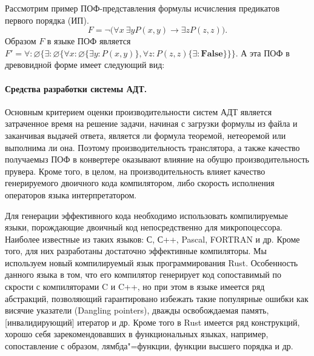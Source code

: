 \documentclass[a4paper]{jctart15b}
\begin{document}
\begin{example}
Рассмотрим пример ПОФ-представления формулы исчисления предикатов первого порядка (ИП).
$$F= \neg\bigl(\forall x\:\exists y P(x,y)\rightarrow \exists z P(z,z)\bigr).$$
Образом $F$ в языке ПОФ является $F' = \forall\colon \varnothing\{\exists\colon\varnothing\{\forall x\colon\varnothing\{\exists y\colon P(x,y)\}, \forall z\colon P(z,z)\{\exists\colon\boldsymbol{False}\}\}\}.$
А эта ПОФ в древовидной форме имеет следующий вид:
\begin{center}
\end{center}
\end{example}

\paragraph{Средства разработки системы АДТ.}
Основным критерием оценки производительности систем АДТ является затраченное время на решение задачи, начиная с загрузки формулы из файла и заканчивая выдачей ответа, является ли формула теоремой, нетеоремой или выполнима ли она. Поэтому производительность транслятора, а также качество получаемыз ПОФ в конвертере оказывают влияние на обущю производительность прувера. Кроме того, в целом, на производительность влияет качество генерируемого двоичного кода компилятором, либо скорость исполнения операторов языка интерпретатором.

Для генерации эффективного кода необходимо использовать компилируемые языки, порождающие двоичный код непосредственно для микропоцессора. Наиболее известные из таких языков: С, С++, Pascal, FORTRAN и др. Кроме того, для них разработаны достаточно эффективные компиляторы. Мы используем новый компилируемый язык программирования Rust. Особенность данного языка в том, что его компилятор генерирует код сопоставимый по скрости с компиляторами C и C++, но при этом в языке имеется ряд абстракций, позволяющий гарантировано избежать такие популярные ошибки как висячие указатели (Dangling pointers), дважды освобождаемая память, [инвалидирующий] итератор и др. Кроме того в Rust имеется ряд конструкций, хорошо себя зарекомендовавших в функциональных языках, например, сопоставление с образом, лямбда"=функции, функции высшего порядка и др.
\end{document}
